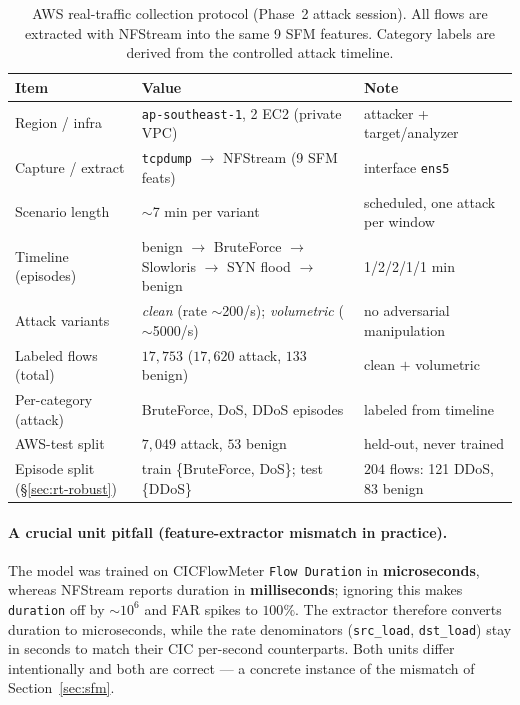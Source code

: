 \documentclass[preprint,12pt,authoryear]{elsarticle}
\begin{document}
\begin{table}[h]
\centering
\caption{AWS real-traffic collection protocol (Phase~2 attack session). All flows
are extracted with NFStream into the same 9 SFM features. Category labels are
derived from the controlled attack timeline.}
\label{tab:aws-protocol}
\small
\begin{tabular}{lll}
\toprule
Item & Value & Note \\
\midrule
Region / infra & \texttt{ap-southeast-1}, 2 EC2 (private VPC) & attacker + target/analyzer \\
Capture / extract & \texttt{tcpdump} $\to$ NFStream (9 SFM feats) & interface \texttt{ens5} \\
Scenario length & $\sim$7 min per variant & scheduled, one attack per window \\
Timeline (episodes) & benign $\to$ BruteForce $\to$ Slowloris $\to$ SYN flood $\to$ benign & 1/2/2/1/1 min \\
Attack variants & \emph{clean} (rate $\sim$200/s); \emph{volumetric} ($\sim$5000/s) & no adversarial manipulation \\
Labeled flows (total) & $17{,}753$ ($17{,}620$ attack, $133$ benign) & clean $+$ volumetric \\
Per-category (attack) & BruteForce, DoS, DDoS episodes & labeled from timeline \\
AWS-test split & $7{,}049$ attack, $53$ benign & held-out, never trained \\
Episode split (§\ref{sec:rt-robust}) & train \{BruteForce, DoS\}; test \{DDoS\} & $204$ flows: 121 DDoS, 83 benign \\
\bottomrule
\end{tabular}
\end{table}

\paragraph{A crucial unit pitfall (feature-extractor mismatch in practice).} The
model was trained on CICFlowMeter \texttt{Flow Duration} in \textbf{microseconds},
whereas NFStream reports duration in \textbf{milliseconds}; ignoring this makes
\texttt{duration} off by $\sim$$10^6$ and FAR spikes to $100\%$. The extractor
therefore converts duration to microseconds, while the rate denominators
(\texttt{src\_load}, \texttt{dst\_load}) stay in seconds to match their CIC
per-second counterparts. Both units differ intentionally and both are correct --- a
concrete instance of the mismatch of Section~\ref{sec:sfm}.
\end{document}

